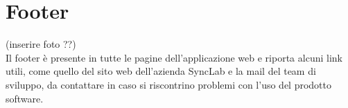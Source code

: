 \section{Footer}\label{UtilizzoDiGDPGatheringDetecionPlatformFooter}
(inserire foto ??) \\
Il footer è presente in tutte le pagine dell'applicazione web e riporta alcuni link utili, come quello del sito web dell'azienda SyncLab e la mail del team di sviluppo, da contattare in caso si riscontrino problemi con l'uso del prodotto software. 



